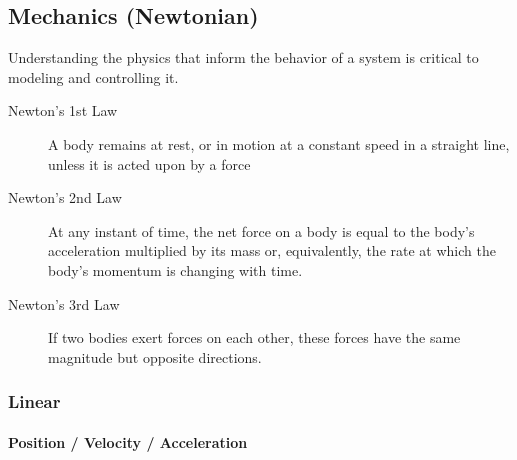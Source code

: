 \documentclass[../notes.tex]{subfiles}
\begin{document}
\subsection{Mechanics (Newtonian)}
Understanding the physics that inform the behavior of a system is critical to modeling and controlling it.
\begin{description}
    \item[Newton's 1st Law] A body remains at rest, or in motion at a constant speed in a straight line, unless it is acted upon by a force
    \item[Newton's 2nd Law] At any instant of time, the net force on a body is equal to the body's acceleration multiplied by its mass or, equivalently, the rate at which the body's momentum is changing with time.
    \item[Newton's 3rd Law] If two bodies exert forces on each other, these forces have the same magnitude but opposite directions.
\end{description}
\subsubsection{Linear}
\paragraph{Position / Velocity / Acceleration}
\end{document}
